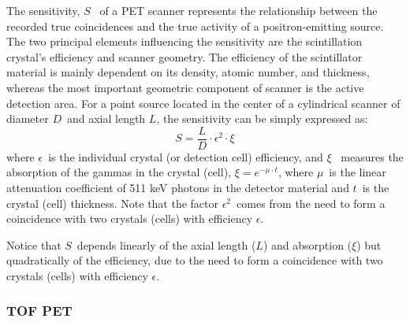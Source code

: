 The sensitivity, $S$~ of a PET scanner represents the relationship between the recorded true coincidences and the true activity of a positron-emitting source. The two principal elements influencing the sensitivity are the scintillation crystal’s efficiency and scanner geometry. The efficiency of the scintillator material is mainly dependent on its density, atomic number, and thickness, whereas the most important geometric component of scanner is the active detection area. For a point source located in the center of a cylindrical scanner of diameter $D$~and axial length $L$, the sensitivity 
can be simply expressed as:
%
\begin{equation}
S = \frac{L}{D} \cdot \epsilon^2 \cdot \xi
\label{eq.sensi}
\end{equation}
%
where $\epsilon$~is the individual crystal (or detection cell) efficiency, and $\xi$~ measures the absorption of the gammas in the crystal (cell), $\xi = e^{-\mu \cdot t}$, where $\mu$~is the linear attenuation coefficient of 511 keV photons in the detector material and $t$~is the crystal (cell) thickness. Note that the factor $\epsilon^2$~comes from the need to form a coincidence with two crystals (cells) with efficiency $\epsilon$.  

Notice that $S$~depends linearly of the axial length ($L$) and absorption ($\xi$) but quadratically of the efficiency, due to the need to form a coincidence with two crystals (cells) with efficiency $\epsilon$. 

\subsubsection*{TOF PET}

